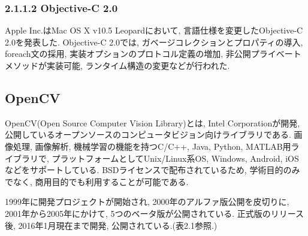 \subsubsection{2.1.1.2 Objective-C 2.0}
Apple Inc.はMac OS X v10.5 Leopardにおいて, 言語仕様を変更したObjective-C 2.0を発表した.
Objective-C 2.0では, ガベージコレクションとプロパティの導入, foreach文の採用, 実装オプションのプロトコル定義の増加, 非公開プライベートメソッドが実装可能, ランタイム構造の変更などが行われた.

\subsection{OpenCV}
OpenCV(Open Source Computer Vision Library)とは, Intel Corporationが開発, 公開しているオープンソースのコンピュータビジョン向けライブラリである.
画像処理, 画像解析, 機械学習の機能を持つC/C++, Java, Python, MATLAB用ライブラリで, プラットフォームとしてUnix/Linux系OS, Windows, Android, iOSなどをサポートしている.
BSDライセンスで配布されているため, 学術目的のみでなく, 商用目的でも利用することが可能である.

1999年に開発プロジェクトが開始され, 2000年のアルファ版公開を皮切りに, 2001年から2005年にかけて, 5つのベータ版が公開されている.
正式版のリリース後, 2016年1月現在まで開発, 公開されている.(表2.1参照.)

